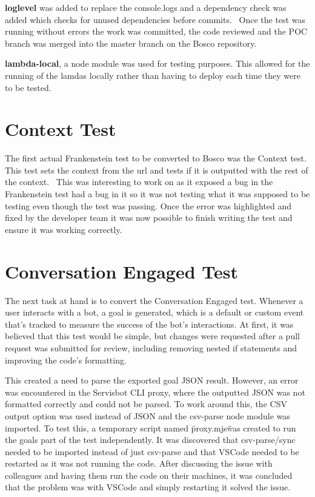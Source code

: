 \documentclass[12pt,a4paper,titlepage]{report}
\begin{document}
\textbf{loglevel} was added to replace the console.logs and a dependency check
was added which checks for unused dependencies before commits.  Once the test was running without errors the work
was committed, the code reviewed and the POC branch was merged into the master branch on the Bosco repository.

\textbf{lambda-local}, a node module was used for testing purposes. This allowed for the running of the lamdas locally rather than having 
to deploy each time they were to be tested. 

\section{Context Test}
The first actual Frankenstein test to be converted to Bosco was the Context test. This test sets the context from the url
and tests if it is outputted with the rest of the context.  This was interesting to work on as it exposed a bug in the Frankenstein test had a bug in it so it was not testing what it was supposed to be
testing even though the test was passing. Once the error was highlighted and fixed by the developer team it was now possible to finish writing the test
and ensure it was working correctly. 

\section{Conversation Engaged Test}
The next task at hand is to convert the Conversation Engaged test. Whenever a user interacts with a bot, a goal is generated, which is a default or custom event that's tracked to measure the success of the bot's interactions.
At first, it was believed that this test would be simple, but changes were requested after a pull request was submitted for review, including removing nested if statements and improving the code's formatting.

This created a need to parse the exported goal JSON result. However, an error was encountered in the Servisbot CLI proxy, where the outputted JSON was not formatted correctly and could not be parsed. To work around this, the CSV output option was used instead of JSON and the csv-parse node module was imported.
To test this, a temporary script named \"proxy.mjs\" was created to run the goals part of the test independently. It was discovered that csv-parse/sync needed to be imported instead of just csv-parse and that VSCode needed to be restarted as it was not running the code. After discussing the issue with colleagues and having them run the code on their machines, it was concluded that the problem was with VSCode and simply restarting it solved the issue.
\end{document}
